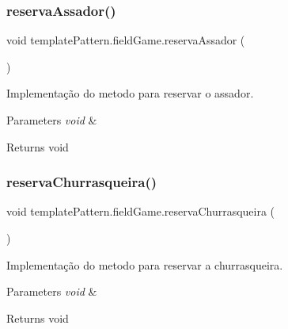 \subsubsection{\texorpdfstring{reservaAssador()}{reservaAssador()}}
{\footnotesize\ttfamily void template\+Pattern.\+field\+Game.\+reserva\+Assador (\begin{DoxyParamCaption}{ }\end{DoxyParamCaption})}



Implementação do metodo para reservar o assador. 


\begin{DoxyParams}{Parameters}
{\em void} & \\
\hline
\end{DoxyParams}
\begin{DoxyReturn}{Returns}
void 
\end{DoxyReturn}
\mbox{\label{classtemplate_pattern_1_1field_game_aaa69b2ab5c2671eed6fea706af6df22f}} 
\subsubsection{\texorpdfstring{reservaChurrasqueira()}{reservaChurrasqueira()}}
{\footnotesize\ttfamily void template\+Pattern.\+field\+Game.\+reserva\+Churrasqueira (\begin{DoxyParamCaption}{ }\end{DoxyParamCaption})}



Implementação do metodo para reservar a churrasqueira. 


\begin{DoxyParams}{Parameters}
{\em void} & \\
\hline
\end{DoxyParams}
\begin{DoxyReturn}{Returns}
void 
\end{DoxyReturn}
\mbox{\label{classtemplate_pattern_1_1field_game_a1c942ed46a860b6b19d5fd77fe8ff0c3}} 
